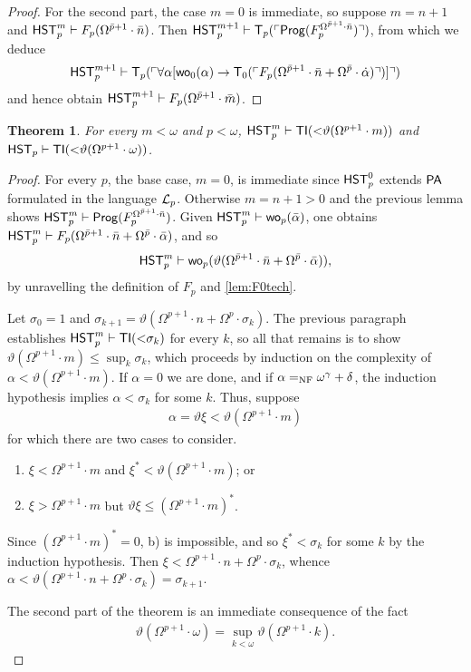\documentclass[UKenglish,cleveref,DIV=12]{scrartcl}
\newtheorem{theorem}{Theorem}[section]
\theoremstyle{definition}
\theoremstyle{definition}
\begin{document}
\begin{proof}
For the second part, the case $m=0$ is immediate, so suppose $m=n+1$ and $\mathsf{HST}_p^m\vdash
F_p(\Omega^{\bar p+1}\cdot\bar n)$. Then
$\mathsf{HST}_p^{m+1}\vdash\mathsf{T}_p(\ulcorner{\mathsf{Prog}(F_p^{\Omega^{\bar p+1}\cdot\bar n})}\urcorner)$, from which we deduce
\begin{align*}
  \mathsf{HST}_p^{m+1}\vdash\mathsf{T}_p(\ulcorner{\forall\alpha[\mathsf{wo}_0(\alpha)\rightarrow\mathsf{T}_0(\ulcorner{F_p(\Omega^{\bar p+1}\cdot\bar n+\Omega^{\bar p}\cdot\dot\alpha)}\urcorner)]}\urcorner)
\end{align*}
and hence obtain $\mathsf{HST}_p^{m+1}\vdash F_p(\Omega^{\bar p+1}\cdot\bar m)$.
\end{proof}
\begin{theorem}\label{thm:Fplowerbound}
 For every $m<\omega$ and $p<\omega$,
$\mathsf{HST}_p^{m}\vdash\mathsf{TI}(\mathord<\vartheta(\Omega^{p+1}\cdot m))$ and
$\mathsf{HST}_p\vdash\mathsf{TI}(\mathord<\vartheta(\Omega^{p+1}\cdot\omega))$.
\end{theorem}
\begin{proof}
For every $p$, the base case, $m=0$, is immediate since $\mathsf{HST}_p^0$ extends $\mathsf{PA}$
formulated in the language $\mathcal{L}_p$. Otherwise $m=n+1>0$ and the previous lemma
shows $\mathsf{HST}_p^m\vdash\mathsf{Prog}( F_p^{\Omega^{\bar p+1}\cdot\bar n})$. Given $\mathsf{HST}_p^m\vdash
\mathsf{wo}_p(\bar \alpha)$, one obtains $\mathsf{HST}_p^m\vdash F_p(\Omega^{\bar p+1}\cdot\bar
n+\Omega^{\bar p}\cdot\bar\alpha)$, and so
\begin{align*}
  \mathsf{HST}_p^m\vdash\mathsf{wo}_p(\vartheta(\Omega^{\bar p+1}\cdot\bar n+\Omega^{\bar p}\cdot\bar\alpha)),
\end{align*}
by unravelling the definition of $F_p$ and \cref{lem:F0tech}.

Let $\sigma_0=1$ and $\sigma_{k+1}=\vartheta(\Omega^{p+1}\cdot
n+\Omega^p\cdot\sigma_k)$. The previous paragraph establishes $\mathsf{HST}_p^m\vdash
\mathsf{TI}(\mathord<\sigma_k)$ for every $k$, so all that remains is to show
$\vartheta(\Omega^{p+1}\cdot m)\le\sup_k\sigma_k$, which proceeds by induction
on the complexity of $\alpha<\vartheta(\Omega^{p+1}\cdot m)$. If $\alpha=0$ we are
done, and if $\alpha=_{\mathrm{NF}}\omega^\gamma+\delta$, the induction hypothesis implies
$\alpha<\sigma_k$ for some $k$. Thus, suppose
\begin{gather*}
  \alpha=\vartheta\xi<\vartheta(\Omega^{p+1}\cdot m)
\end{gather*}
for which there are two cases to consider.
\begin{enumerate}
 \item $\xi<\Omega^{p+1}\cdot m$ and $\xi^*<\vartheta(\Omega^{p+1}\cdot m)$; or
 \item $\xi>\Omega^{p+1}\cdot m$ but $\vartheta\xi\le(\Omega^{p+1}\cdot m)^*$.
\end{enumerate}
Since $(\Omega^{p+1}\cdot m)^*=0$, b) is impossible, and so
$\xi^*<\sigma_k$ for some $k$ by the induction hypothesis. Then
$\xi<\Omega^{p+1}\cdot n+\Omega^p\cdot\sigma_k$, whence
$\alpha<\vartheta(\Omega^{p+1}\cdot n+\Omega^p\cdot\sigma_k)=\sigma_{k+1}$.

The second part of the theorem is an immediate consequence of the fact
\begin{align*}
  \vartheta(\Omega^{p+1}\cdot \omega)=\sup_{k<\omega}\vartheta(\Omega^{p+1}\cdot k).
\end{align*}
\end{proof}
\end{document}
